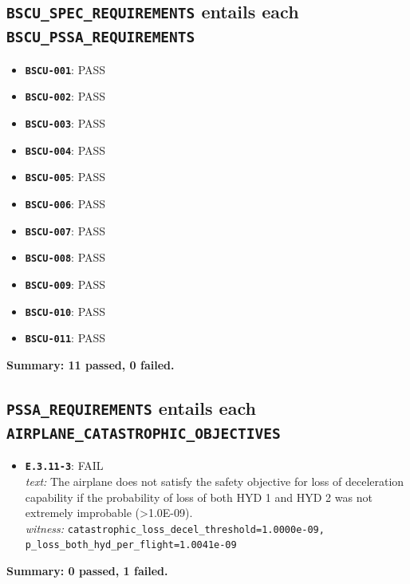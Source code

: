 \documentclass[11pt,a4paper]{article}
\begin{document}
\subsection*{\texttt{BSCU\_SPEC\_REQUIREMENTS} entails each \texttt{BSCU\_PSSA\_REQUIREMENTS}}
\begin{itemize}
\item \textbf{\texttt{BSCU-001}}: PASS
\item \textbf{\texttt{BSCU-002}}: PASS
\item \textbf{\texttt{BSCU-003}}: PASS
\item \textbf{\texttt{BSCU-004}}: PASS
\item \textbf{\texttt{BSCU-005}}: PASS
\item \textbf{\texttt{BSCU-006}}: PASS
\item \textbf{\texttt{BSCU-007}}: PASS
\item \textbf{\texttt{BSCU-008}}: PASS
\item \textbf{\texttt{BSCU-009}}: PASS
\item \textbf{\texttt{BSCU-010}}: PASS
\item \textbf{\texttt{BSCU-011}}: PASS
\end{itemize}
\textbf{Summary: 11 passed, 0 failed.}
\subsection*{\texttt{PSSA\_REQUIREMENTS} entails each \texttt{AIRPLANE\_CATASTROPHIC\_OBJECTIVES}}
\begin{itemize}
\item \textbf{\texttt{E.3.11-3}}: FAIL \\
\textit{text:} The airplane does not satisfy the safety objective for loss of deceleration capability if the probability of loss of both HYD 1 and HYD 2 was not extremely improbable (>1.0E-09). \\
\textit{witness:} \texttt{catastrophic\_loss\_decel\_threshold=1.0000e-09, p\_loss\_both\_hyd\_per\_flight=1.0041e-09}
\end{itemize}
\textbf{Summary: 0 passed, 1 failed.}
\end{document}
